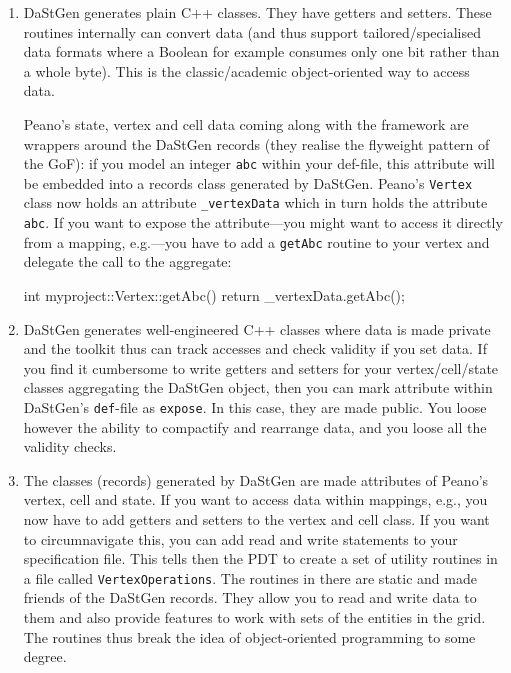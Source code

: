 \begin{enumerate}
  \item DaStGen generates plain C++ classes. They have getters and setters.
  These routines internally can convert data (and thus support
  tailored/specialised data formats where a Boolean for example consumes only
  one bit rather than a whole byte). This is the classic/academic
  object-oriented way to access data.
  
  Peano's state, vertex and cell data coming along with the framework are
  wrappers around the DaStGen records (they realise the flyweight pattern of
  the GoF): if you model an integer \texttt{abc} within your def-file, this
  attribute will be embedded into a records class generated by DaStGen. Peano's
  \texttt{Vertex} class now holds an attribute \texttt{\_vertexData} which in
  turn holds the attribute \texttt{abc}. If you want to expose the
  attribute---you might want to access it directly from a mapping, e.g.---you
  have to add a \texttt{getAbc} routine to your vertex and delegate the call to
  the aggregate:
  \begin{code}
int myproject::Vertex::getAbc() {
  return _vertexData.getAbc();
}
  \end{code}
  \item DaStGen generates well-engineered C++ classes where data is made private
  and the toolkit thus can track accesses and check validity if you set data. If
  you find it cumbersome to write getters and setters for your vertex/cell/state
  classes aggregating the DaStGen object, then you can mark attribute within
  DaStGen's \texttt{def}-file as \texttt{expose}. In this case, they are made
  public. You loose however the ability to compactify and rearrange data, and
  you loose all the validity checks.
  \item The classes (records) generated by DaStGen are made attributes of
  Peano's vertex, cell and state. If you want to access data within mappings,
  e.g., you now have to add getters and setters to the vertex and cell class.
  If you want to circumnavigate this, you can add read and write statements to
  your specification file. This tells then the PDT to create a set of utility
  routines in a file called \texttt{VertexOperations}. The routines in there are
  static and made friends of the DaStGen records. They allow you to read and
  write data to them and also provide features to work with sets of the entities
  in the grid. The routines thus break the idea of object-oriented programming
  to some degree. 
\end{enumerate}

